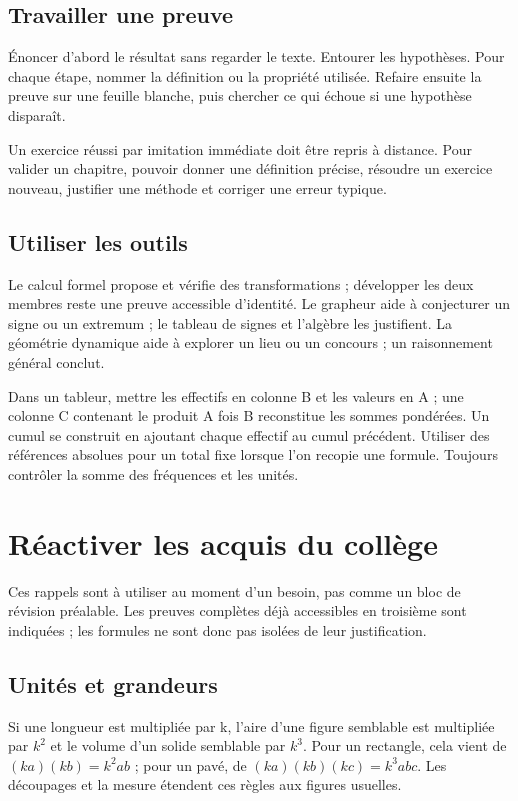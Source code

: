 \documentclass[11pt,a4paper,oneside]{book}
\begin{document}
\section{Travailler une preuve}
Énoncer d'abord le résultat sans regarder le texte. Entourer les hypothèses. Pour chaque étape, nommer la définition ou la propriété utilisée. Refaire ensuite la preuve sur une feuille blanche, puis chercher ce qui échoue si une hypothèse disparaît.

Un exercice réussi par imitation immédiate doit être repris à distance. Pour valider un chapitre, pouvoir donner une définition précise, résoudre un exercice nouveau, justifier une méthode et corriger une erreur typique.
\section{Utiliser les outils}
Le calcul formel propose et vérifie des transformations ; développer les deux membres reste une preuve accessible d'identité. Le grapheur aide à conjecturer un signe ou un extremum ; le tableau de signes et l'algèbre les justifient. La géométrie dynamique aide à explorer un lieu ou un concours ; un raisonnement général conclut.

Dans un tableur, mettre les effectifs en colonne B et les valeurs en A ; une colonne C contenant le produit A fois B reconstitue les sommes pondérées. Un cumul se construit en ajoutant chaque effectif au cumul précédent. Utiliser des références absolues pour un total fixe lorsque l'on recopie une formule. Toujours contrôler la somme des fréquences et les unités.

\chapter{Réactiver les acquis du collège}
Ces rappels sont à utiliser au moment d'un besoin, pas comme un bloc de révision préalable. Les preuves complètes déjà accessibles en troisième sont indiquées ; les formules ne sont donc pas isolées de leur justification.
\section{Unités et grandeurs}
Si une longueur est multipliée par k, l'aire d'une figure semblable est multipliée par $k^2$ et le volume d'un solide semblable par $k^3$. Pour un rectangle, cela vient de $(ka)(kb)=k^2ab$ ; pour un pavé, de $(ka)(kb)(kc)=k^3abc$. Les découpages et la mesure étendent ces règles aux figures usuelles.
\end{document}
